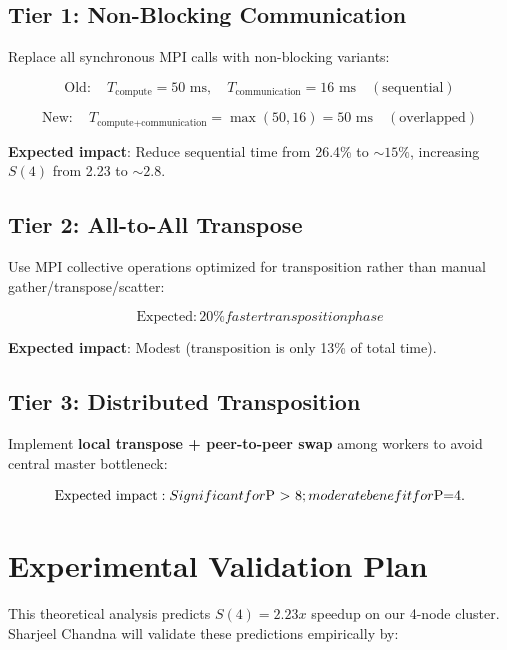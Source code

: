 \documentclass[11pt,a4paper]{article}
\theoremstyle{definition}
\begin{document}
\subsection{Tier 1: Non-Blocking Communication}

Replace all synchronous MPI calls with non-blocking variants:

\[
\text{Old}: \quad T_{\text{compute}} = 50 \text{ ms}, \quad T_{\text{communication}} = 16 \text{ ms} \quad (\text{sequential})
\]

\[
\text{New}: \quad T_{\text{compute+communication}} = \max(50, 16) = 50 \text{ ms} \quad (\text{overlapped})
\]

\textbf{Expected impact}: Reduce sequential time from 26.4\% to $\sim 15\%$, increasing $S(4)$ from 2.23 to $\sim 2.8$.

\subsection{Tier 2: All-to-All Transpose}

Use MPI collective operations optimized for transposition rather than manual gather/transpose/scatter:

\[
\text{Expected}: 20\% faster transposition phase
\]

\textbf{Expected impact}: Modest (transposition is only 13\% of total time).

\subsection{Tier 3: Distributed Transposition}

Implement \textbf{local transpose + peer-to-peer swap} among workers to avoid central master bottleneck:

\[
\text{Expected impact}: Significant for $P > 8$; moderate benefit for $P=4$.
\]

\section{Experimental Validation Plan}

This theoretical analysis predicts $S(4) = 2.23x$ speedup on our 4-node cluster. Sharjeel Chandna will validate these predictions empirically by:
\end{document}
